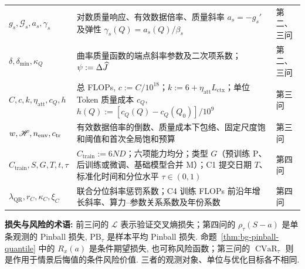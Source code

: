 \begin{table}[H]
\begin{tabular}{P{2.9cm}P{8.4cm}P{2.0cm}}
$g_s, \mathcal G_s, a_s, \gamma_s$ & 对数质量响应、有效数据倍率、质量斜率 $a_s=-g_s'$ 及弹性 $\gamma_s(Q)=a_s(Q)/\beta_s$ & 第二、三问\\
$\delta, \delta_{\min}, \kappa_Q$ & 曲率质量函数的端点斜率参数及二次项系数；$\psi:=\Delta\widehat J$ & 第二、三问\\
$C, c, k, \eta_{\mathrm{att}}, c_Q, h$ & 总 FLOPs, $c:=C/10^{18}$；$k:=6+\eta_{\mathrm{att}}L_{\mathrm{ctx}}$；单位 Token 质量成本 $c_Q$, $h(Q):=[c_Q(Q)-c_Q(Q_0)]/10^9$ & 第三问\\
$w, \mathscr H, n_{\rm env}, c_{\rm tr}$ & 有效数据倍率的倒数、质量成本下包络、固定尺度饱和阈值和首次全局饱和预算 & 第三问\\
$C_{\mathrm{train}}, S, G, T, t, \tau$ & $C_{\mathrm{train}}:=6ND$；六项能力均分；类型 $G$（预训练 P、后训练或微调、基础模型合并 M）；C1 提交日期 $T$、标准化时间和分位水平 $\tau\in(0, 1)$ & 第四问\\
$\lambda_{\mathrm{QR}}, r_C, \kappa_C, \xi_C$ & 联合分位斜率惩罚系数；C4 训练 FLOPs 前沿年增长斜率、算力--参数关系系数及年份系数 & 第四问\\\bottomrule
\end{tabular}
\end{table}

\textbf{损失与风险的术语: } 前三问的 $\mathcal L$ 表示验证交叉熵损失；第四问的 $\rho_\tau(S-a)$ 是单条观测的 Pinball 损失, $\mathrm{PB}_\tau$ 是样本平均 Pinball 损失. 命题~\ref{thm:bg-pinball-quantile} 中的 $R_x(a)$ 是条件期望损失, 也可称风险函数；第三问的 $\operatorname{CVaR}_\tau$ 则是作用于情景后悔值的条件风险价值. 三者的观测对象、单位与优化目标各不相同. 